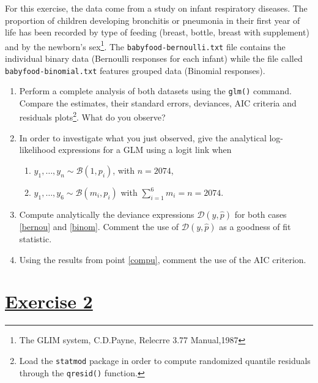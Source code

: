 \documentclass[a4paper,12pt]{article}\usepackage[]{graphicx}\usepackage[]{color}
\begin{document}
For this exercise, the data come from a study on infant respiratory diseases. The proportion of children developing bronchitis or pneumonia in their first year of life has been recorded by type of feeding (breast, bottle, breast with supplement) and by the newborn's sex\footnote{The GLIM
system, C.D.Payne, Relecrre 3.77 Manual,1987}. The \verb"babyfood-bernoulli.txt" file contains the individual binary data (Bernoulli
responses for each infant) while the file called \texttt{babyfood-binomial.txt} features grouped data (Binomial responses).
\begin{enumerate}
\item{Perform a complete analysis of both datasets using the \texttt{glm()} command. Compare the estimates, their standard errors, deviances, AIC criteria and residuals plots\footnote{Load the \texttt{statmod} package in order to compute randomized quantile residuals through the \texttt{qresid()} function.}. What do you observe?}
\item{In order to investigate what you just observed, give the analytical log-likelihood expressions for a GLM using a logit link when
\begin{enumerate}
\item\label{bernou}{$y_1,\ldots,y_n \sim \mathcal{B}(1, p_i)$, with $n=2074$,}
\item\label{binom}{$y_1,\ldots,y_6 \sim  \mathcal{B}(m_i,p_i)$ with $\sum_{i=1}^6 m_i = n = 2074$.}
\end{enumerate}}
\item\label{compu}{Compute analytically the deviance expressions $\mathcal{D}(y,\hat{p})$ for both cases \ref{bernou} and \ref{binom}. Comment the use of $\mathcal{D}(y,\hat{p})$ as a goodness of fit statistic.}
\item{Using the results from point \ref{compu}, comment the use of the AIC criterion.}
\end{enumerate}

\section{\underline{Exercise 2}}
\end{document}
